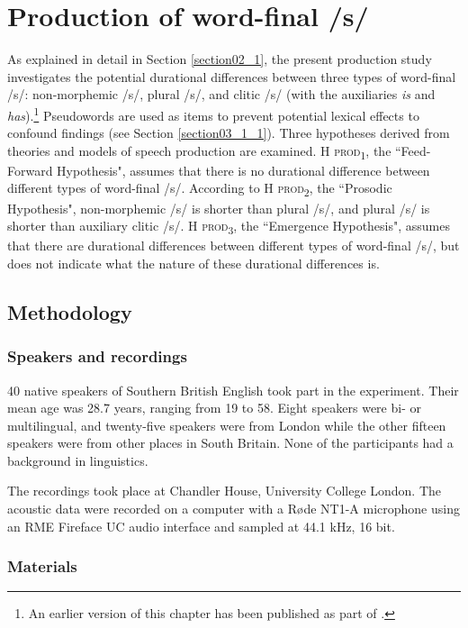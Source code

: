 \chapter{Production of word-final /s/}\label{chapter04}

As explained in detail in Section \ref{section02_1}, the present production study investigates the potential durational differences between three types of word-final /s/: non-morphemic /s/, plural /s/, and clitic /s/ (with the auxiliaries \textit{is} and \textit{has}).\footnote{An earlier version of this chapter has been published as part of \citet{Schmitz2021a}.} Pseudowords are used as items to prevent potential lexical effects to confound findings (see Section \ref{section03_1_1}). Three hypotheses derived from theories and models of speech production are examined. \textsc{H prod\textsubscript{1}}, the ``Feed-Forward Hypothesis", assumes that there is no durational difference between different types of word-final /s/. According to \textsc{H prod\textsubscript{2}}, the ``Prosodic Hypothesis", non-morphemic /s/ is shorter than plural /s/, and plural /s/ is shorter than auxiliary clitic /s/. \textsc{H prod\textsubscript{3}}, the ``Emergence Hypothesis", assumes that there are durational differences between different types of word-final /s/, but does not indicate what the nature of these durational differences is.

\section{Methodology}\label{section04_1}

\subsection{Speakers and recordings}\label{section04_1_1}

40 native speakers of Southern British English took part in the experiment. Their mean age was 28.7 years, ranging from 19 to 58. Eight speakers were bi- or multilingual, and twenty-five speakers were from London while the other fifteen speakers were from other places in South Britain. None of the participants had a background in linguistics.

The recordings took place at Chandler House, University College London. The acoustic data were recorded on a computer with a Røde NT1-A microphone using an RME Fireface UC audio interface and sampled at 44.1 kHz, 16 bit.

\subsection{Materials}\label{section04_1_2}

